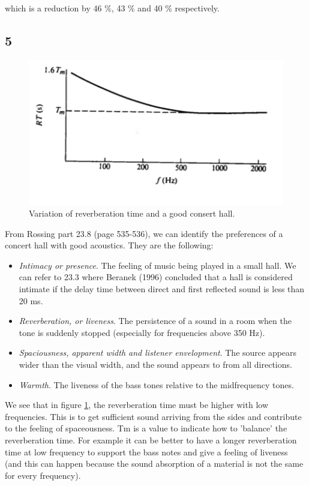 \documentclass{article}
\begin{document}
which is a reduction by 46 \%, 43 \% and 40 \% respectively.

\subsection*{5}

\begin{figure}[H]
    \centering
    \includegraphics{figures/oving1_4.png}
    \caption{Variation of reverberation time and a good consert hall.}
    \label{fig:rt}
\end{figure}


From Rossing part 23.8 (page 535-536), we can identify the preferences of a concert hall with good acoustics. They are the following:


\begin{itemize}
    \item \textit{Intimacy or presence}. The feeling of music being played in a small hall. We can refer to 23.3 where Beranek (1996) concluded that a hall is considered intimate if the delay time between direct and first reflected sound is less than 20 ms.
    \item \textit{Reverberation, or liveness}. The persistence of a sound in a room when the tone is suddenly stopped (especially for frequencies above 350 Hz).
    \item \textit{Spaciousness, apparent width and listener envelopment}. The source appears wider than the visual width, and the sound appears to from all directions.
   \item \textit{Warmth}. The liveness of the bass tones relative to the midfrequency tones.
 
    
\end{itemize}

We see that in figure \ref{fig:rt}, the reverberation time must be higher with low frequencies. This is to get sufficient sound arriving from the sides and contribute to the feeling of spaceousness. 
Tm is a value to indicate how to 'balance' the reverberation time. For example it can be better to have a longer reverberation time at low frequency to support the bass notes and give a feeling of liveness (and this can happen because the sound absorption of a material is not the same for every frequency).
\end{document}
